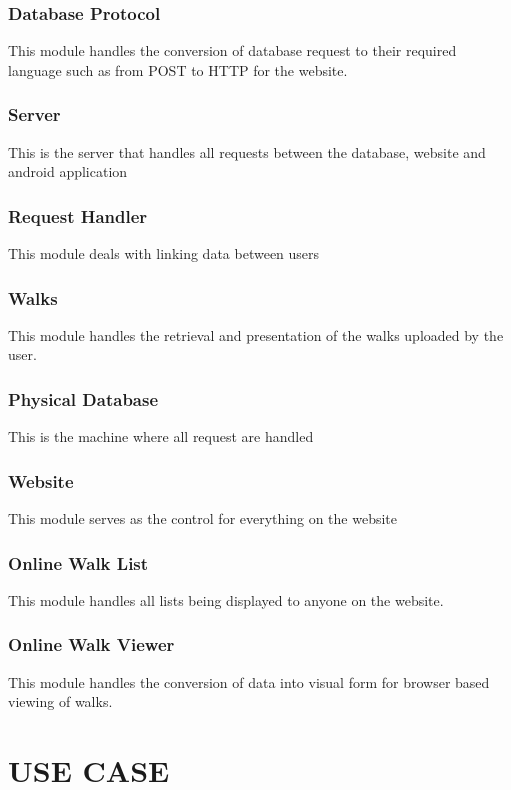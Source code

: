\documentclass[12pt]{article}
\begin{document}
\subsubsection{Database Protocol}
This module handles the conversion of database request to their required language such as from POST to HTTP for the website.
\subsubsection{Server}
This is the server that handles all requests between the database, website and android application
\subsubsection{Request Handler}
\par{This module deals with linking data between users}
\subsubsection{Walks}
This module handles the retrieval and presentation of the walks uploaded by the user.
\subsubsection{Physical Database}
\par{This is the machine where all request are handled}
\subsubsection{Website}
\par{This module serves as the control for everything on the website}
\subsubsection{Online Walk List}
This module handles all lists being displayed to anyone on the website.
\subsubsection{Online Walk Viewer}
This module handles the conversion of data into visual form for browser based viewing of walks.
\newpage
\section{USE CASE}
\end{document}
